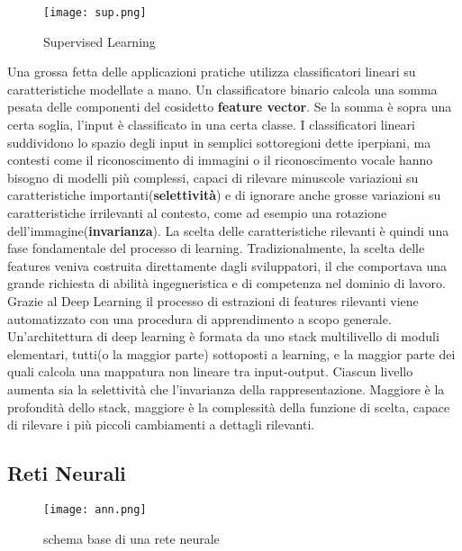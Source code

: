 \begin{figure}
  \texttt{[image: sup.png]}
  \caption{Supervised Learning\cite{sup}}
  \label{fig:sup}
\end{figure}

Una grossa fetta delle applicazioni pratiche utilizza classificatori lineari su caratteristiche modellate a mano. 
Un classificatore binario calcola una somma pesata delle componenti del cosidetto \textbf{feature vector}. Se la somma è sopra una certa soglia, 
l'input è classificato in una certa classe. I classificatori lineari suddividono lo spazio degli input in semplici sottoregioni dette iperpiani, ma contesti come il riconoscimento di immagini o il riconoscimento vocale hanno
bisogno di modelli più complessi, capaci di rilevare  minuscole variazioni su caratteristiche importanti(\textbf{selettività}) e di ignorare anche grosse variazioni su caratteristiche irrilevanti al contesto, come ad esempio una rotazione dell'immagine(\textbf{invarianza}). La scelta delle caratteristiche rilevanti è quindi una
fase fondamentale del processo di learning. Tradizionalmente, la scelta delle features veniva costruita direttamente dagli sviluppatori, il che comportava una grande richiesta di abilità ingegneristica e di competenza nel dominio di lavoro.
Grazie al Deep  Learning  il processo di estrazioni di features rilevanti viene automatizzato con una procedura di apprendimento a scopo generale.
Un'architettura di deep learning è formata da uno stack multilivello di moduli elementari, tutti(o la maggior parte) sottoposti a learning, e la maggior parte dei quali
calcola una mappatura non lineare tra input-output. Ciascun livello aumenta sia la selettività che l'invarianza della rappresentazione. 
Maggiore è la profondità dello stack, maggiore è la complessità della funzione di scelta, capace di rilevare i più piccoli cambiamenti a dettagli rilevanti\cite{deep}.

\subsection{Reti Neurali}

\begin{figure}
  \texttt{[image: ann.png]}
  \caption{schema base di una rete neurale\cite{ann}}
\end{figure}











    